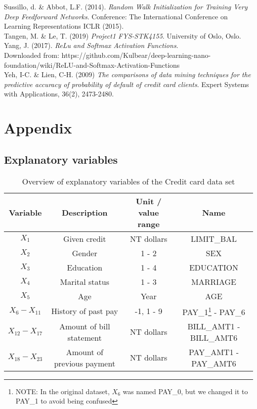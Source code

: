 \documentclass[11pt,english, A4]{article}
\begin{document}
Sussillo, d. \& Abbot, L.F. (2014). \textit{Random Walk Initialization for Training Very Deep Feedforward Networks}. Conference: The International Conference on Learning Representations ICLR (2015).\\

Tangen, M. \& Le, T. (2019) \textit{Project1 FYS-STK4155}. University of Oslo, Oslo.\\

Yang, J. (2017). \textit{ReLu and Softmax Activation Functions}. \\
Downloaded from: https://github.com/Kulbear/deep-learning-nano-foundation/wiki/ReLU-and-Softmax-Activation-Functions\\

Yeh, I-C. \& Lien, C-H. (2009) \textit{The comparisons of data mining techniques for the predictive accuracy of probability of default of credit card clients}. Expert Systems with Applications, 36(2), 2473-2480.\\

\newpage


\section{Appendix}


\subsection{Explanatory variables}


\begin{table}[H]
   \centering
   \begin{tabular}{ c | c | c | c} \label{tab:EXPVar}
   Variable & Description & Unit / value range & Name\\
   \hline
   $X_{1}$ & Given credit & NT dollars & LIMIT\_BAL\\
   $X_{2}$ & Gender & 1 - 2 & SEX \\
   $X_{3}$ & Education & 1 - 4 & EDUCATION \\
   $X_{4}$ & Marital status & 1 - 3 & MARRIAGE \\
   $X_{5}$ & Age & Year & AGE \\
   $X_{6} - X_{11}$ & History of past pay & -1, 1 - 9 & PAY\_1\footnote{NOTE: In the original dataset, $X_{6}$ was named    PAY\_0, but we changed it to PAY\_1 to avoid being confused} - PAY\_6 \\
   $X_{12} - X_{17}$ & Amount of bill statement & NT dollars & BILL\_AMT1 - BILL\_AMT6 \\
   $X_{18} - X_{23}$ & Amount of previous payment & NT dollars & PAY\_AMT1 - PAY\_AMT6
  \end{tabular}
  \caption{Overview of explanatory variables of the Credit card data set}
\end{table}
\end{document}

